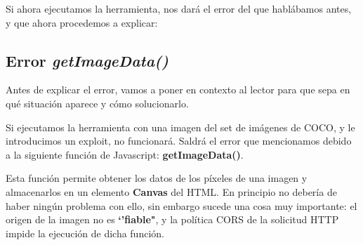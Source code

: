 Si ahora ejecutamos la herramienta, nos dará el error del que hablábamos antes, y que ahora procedemos a explicar:

\subsection{Error \textit{getImageData()}}

Antes de explicar el error, vamos a poner en contexto al lector para que sepa en qué situación aparece y cómo solucionarlo.


Si ejecutamos la herramienta con una imagen del set de imágenes de COCO, y le introducimos un exploit, no funcionará. Saldrá el error que mencionamos debido a la siguiente función de Javascript: \textbf{getImageData()}.

Esta función permite obtener los datos de los píxeles de una imagen y almacenarlos en un elemento \textbf{Canvas} del HTML. En principio no debería de haber ningún problema con ello, sin embargo sucede una cosa muy importante: el origen de la imagen no es \textbf{`'fiable"}, y la política \ac{CORS} de la solicitud HTTP impide la ejecución de dicha función. %



 


